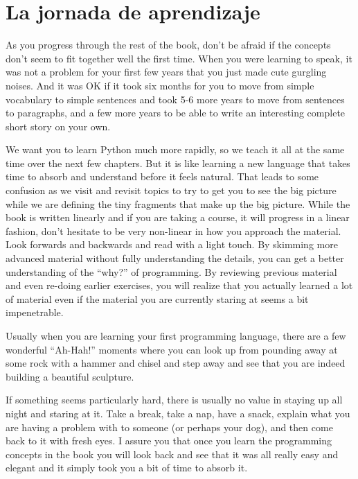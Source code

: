 \section{La jornada de aprendizaje}

As you progress through the rest of the book, don't be afraid if the concepts 
don't seem to fit together well the first time.  When you were learning to speak, 
it was not a problem  for your first few years that you just made cute gurgling noises.
And it was OK if it took six months for you to move from simple vocabulary to 
simple sentences and took 5-6 more years to move from sentences to paragraphs, and a
few more years to be able to write an interesting complete short story on your own.

We want you to learn Python much more rapidly, so we teach it all at the same time
over the next few chapters.  
But it is like learning a new language that takes time to absorb and understand
before it feels natural.
That leads to some confusion as we visit and revisit
topics to try to get you to see the big picture while we are defining the tiny
fragments that make up the big picture.  While the book is written linearly and
if you are taking a course, it will progress in a linear fashion, don't hesitate
to be very non-linear in how you approach the material.  Look forwards and backwards
and read with a light touch.  By skimming more advanced material without 
fully understanding the details, you can get a better understanding of the ``why?'' 
of programming.  By reviewing previous material and even re-doing earlier 
exercises, you will realize that you actually learned a lot of material even 
if the material you are currently staring at seems a bit impenetrable.

Usually when you are learning your first programming language, there are a few
wonderful ``Ah-Hah!'' moments where you can look up from pounding away at some rock
with a hammer and chisel and step away and see that you are indeed building 
a beautiful sculpture.

If something seems particularly hard, there is usually no value in staying up all 
night and staring at it.   Take a break, take a nap, have a snack, explain what you 
are having a problem with to someone (or perhaps your dog), and then come back to it with
fresh eyes.  I assure you that once you learn the programming concepts in the book
you will look back and see that it was all really easy and elegant and it simply 
took you a bit of time to absorb it.

